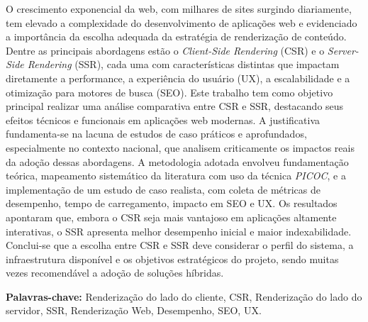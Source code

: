 \begin{resumo}



O crescimento exponencial da web, com milhares de sites surgindo diariamente, tem elevado a complexidade do desenvolvimento de aplicações web e evidenciado a importância da escolha adequada da estratégia de renderização de conteúdo. Dentre as principais abordagens estão o \textit{Client-Side Rendering} (CSR) e o \textit{Server-Side Rendering} (SSR), cada uma com características distintas que impactam diretamente a performance, a experiência do usuário (UX), a escalabilidade e a otimização para motores de busca (SEO). Este trabalho tem como objetivo principal realizar uma análise comparativa entre CSR e SSR, destacando seus efeitos técnicos e funcionais em aplicações web modernas. A justificativa fundamenta-se na lacuna de estudos de caso práticos e aprofundados, especialmente no contexto nacional, que analisem criticamente os impactos reais da adoção dessas abordagens. A metodologia adotada envolveu fundamentação teórica, mapeamento sistemático da literatura com uso da técnica \textit{PICOC}, e a implementação de um estudo de caso realista, com coleta de métricas de desempenho, tempo de carregamento, impacto em SEO e UX. Os resultados apontaram que, embora o CSR seja mais vantajoso em aplicações altamente interativas, o SSR apresenta melhor desempenho inicial e maior indexabilidade. Conclui-se que a escolha entre CSR e SSR deve considerar o perfil do sistema, a infraestrutura disponível e os objetivos estratégicos do projeto, sendo muitas vezes recomendável a adoção de soluções híbridas.

\textbf{Palavras-chave: } Renderização do lado do cliente, CSR, Renderização do lado do servidor, SSR, Renderização Web, Desempenho, SEO, UX.

\end{resumo}


